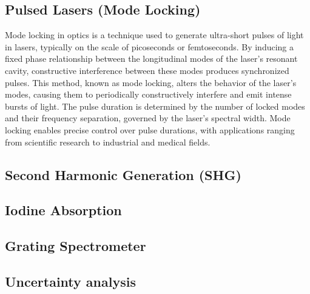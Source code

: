 \subsection{Pulsed Lasers (Mode Locking)}
    Mode locking in optics is a technique used to generate ultra-short pulses of light in lasers, typically on the scale of picoseconds or femtoseconds. 
    By inducing a fixed phase relationship between the longitudinal modes of the laser's resonant cavity, constructive interference between these modes produces synchronized pulses. 
    This method, known as mode locking, alters the behavior of the laser's modes, causing them to periodically constructively interfere and emit intense bursts of light. 
    The pulse duration is determined by the number of locked modes and their frequency separation, governed by the laser's spectral width. 
    Mode locking enables precise control over pulse durations, with applications ranging from scientific research to industrial and medical fields.

\subsection{Second Harmonic Generation (SHG)}

\subsection{Iodine Absorption}


\subsection{Grating Spectrometer}





\subsection{Uncertainty analysis}
\label{sec:unsichi}

